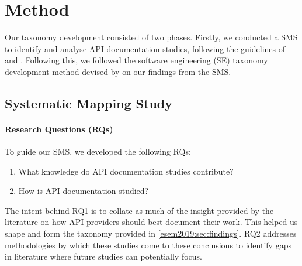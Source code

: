 \section{Method}
\label{esem2019:sec:method}

Our taxonomy development consisted of two phases. Firstly, we conducted a SMS to identify and analyse API documentation studies, following the guidelines of \citet{Kitchenham:2007dd} and \citet{Petersen:2008td}. Following this, we followed the software engineering (SE) taxonomy development method devised by \citet{Usman:2017hn} on our findings from the SMS.

\subsection{Systematic Mapping Study}
\label{esem2019:sec:method:lit-review}

\paragraph{Research Questions (RQs)}

To guide our SMS, we developed the following RQs:

\begin{enumerate}[leftmargin=4\parindent,label=\textbf{RQ\arabic*}]
  \item What knowledge do API documentation studies contribute?
  \item How is API documentation studied?
\end{enumerate}

The intent behind RQ1 is to collate as much of the insight provided by the literature on how API providers should best document their work. This helped us shape and form the taxonomy provided in \cref{esem2019:sec:findings}. RQ2 addresses methodologies by which these studies come to these conclusions to identify gaps in literature where future studies can potentially focus.


